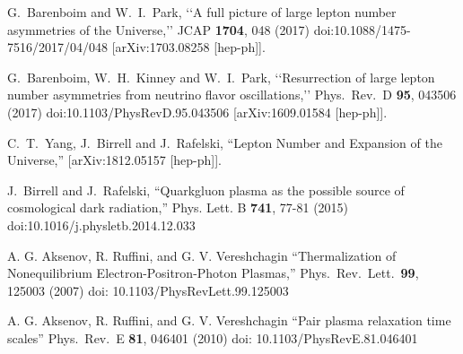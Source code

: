 \documentclass[universe,article,submit,moreauthors,pdftex,a4paper]{Definitions/mdpi}
\begin{document}
\begin{thebibliography}{99}
G.~Barenboim and W.~I.~Park,
\lq\lq A full picture of large lepton number asymmetries of the Universe,\rq\rq
  JCAP {\bf 1704}, 048 (2017)
  doi:10.1088/1475-7516/2017/04/048
  [arXiv:1703.08258 [hep-ph]].

 G.~Barenboim, W.~H.~Kinney and W.~I.~Park,
 \lq\lq Resurrection of large lepton number asymmetries from neutrino flavor oscillations,\rq\rq
  Phys.\ Rev.\ D {\bf 95}, 043506 (2017)
  doi:10.1103/PhysRevD.95.043506
  [arXiv:1609.01584 [hep-ph]].


C.~T.~Yang, J.~Birrell and J.~Rafelski,
``Lepton Number and Expansion of the Universe,''
[arXiv:1812.05157 [hep-ph]].

J.~Birrell and J.~Rafelski,
``Quark\textendash{}gluon plasma as the possible source of cosmological dark radiation,''
Phys. Lett. B \textbf{741}, 77-81 (2015)
doi:10.1016/j.physletb.2014.12.033

A. G. Aksenov, R. Ruffini, and G. V. Vereshchagin
``Thermalization of Nonequilibrium Electron-Positron-Photon Plasmas,''
Phys.\ Rev.\ Lett.\ \textbf{99}, 125003 (2007) 
doi: 10.1103/PhysRevLett.99.125003

A. G. Aksenov, R. Ruffini, and G. V. Vereshchagin
``Pair plasma relaxation time scales''
Phys.\ Rev.\ E \textbf{81}, 046401 (2010)
doi: 10.1103/PhysRevE.81.046401

\end{thebibliography}

\end{document}
